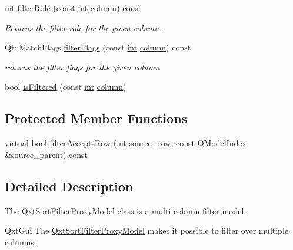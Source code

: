 \begin{DoxyCompactItemize}
\hyperlink{ioapi_8h_a787fa3cf048117ba7123753c1e74fcd6}{int} \hyperlink{class_qxt_sort_filter_proxy_model_aef83983c69105f947db1ab890e963382}{filter\-Role} (const \hyperlink{ioapi_8h_a787fa3cf048117ba7123753c1e74fcd6}{int} \hyperlink{glext_8h_a3b58c39b1b7ca6f4012b27e84de3bdb3}{column}) const 
\begin{DoxyCompactList}\small\item\em Returns the filter role for the given {\itshape column}. \end{DoxyCompactList}\item 
Qt\-::\-Match\-Flags \hyperlink{class_qxt_sort_filter_proxy_model_ae014d83b798aaaca91853a93f55b010c}{filter\-Flags} (const \hyperlink{ioapi_8h_a787fa3cf048117ba7123753c1e74fcd6}{int} \hyperlink{glext_8h_a3b58c39b1b7ca6f4012b27e84de3bdb3}{column}) const 
\begin{DoxyCompactList}\small\item\em returns the filter flags for the given {\itshape column} \end{DoxyCompactList}\item 
bool \hyperlink{class_qxt_sort_filter_proxy_model_af06b946226bde50f9d57056b2f61ba77}{is\-Filtered} (const \hyperlink{ioapi_8h_a787fa3cf048117ba7123753c1e74fcd6}{int} \hyperlink{glext_8h_a3b58c39b1b7ca6f4012b27e84de3bdb3}{column})
\end{DoxyCompactItemize}
\subsection*{Protected Member Functions}
\begin{DoxyCompactItemize}
\item 
virtual bool \hyperlink{class_qxt_sort_filter_proxy_model_ae0fa3aa867f6e42a655e4a74daa4647f}{filter\-Accepts\-Row} (\hyperlink{ioapi_8h_a787fa3cf048117ba7123753c1e74fcd6}{int} source\-\_\-row, const Q\-Model\-Index \&source\-\_\-parent) const 
\end{DoxyCompactItemize}


\subsection{Detailed Description}
The \hyperlink{class_qxt_sort_filter_proxy_model}{Qxt\-Sort\-Filter\-Proxy\-Model} class is a multi column filter model. 

Qxt\-Gui The \hyperlink{class_qxt_sort_filter_proxy_model}{Qxt\-Sort\-Filter\-Proxy\-Model} makes it possible to filter over multiple columns.


